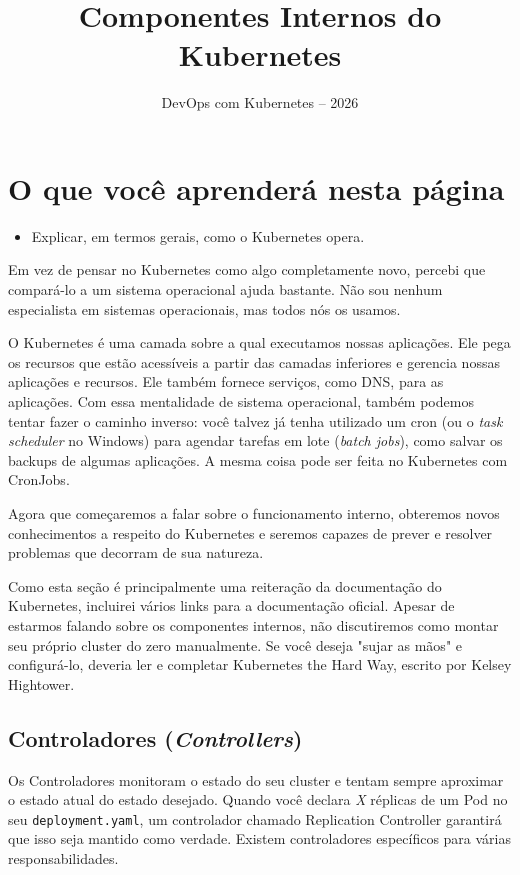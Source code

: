 \documentclass[11pt,a4paper]{article}
\title{\color{secondary}\Huge\textbf{Componentes Internos do Kubernetes}}
\author{\color{primary}DevOps com Kubernetes -- 2026}
\date{}
\begin{document}
\maketitle

\section*{\color{primary}O que você aprenderá nesta página}
\begin{itemize}
    \item Explicar, em termos gerais, como o Kubernetes opera.
\end{itemize}

Em vez de pensar no Kubernetes como algo completamente novo, percebi que compará-lo a um sistema operacional ajuda bastante. Não sou nenhum especialista em sistemas operacionais, mas todos nós os usamos.

O Kubernetes é uma camada sobre a qual executamos nossas aplicações. Ele pega os recursos que estão acessíveis a partir das camadas inferiores e gerencia nossas aplicações e recursos. Ele também fornece serviços, como DNS, para as aplicações. Com essa mentalidade de sistema operacional, também podemos tentar fazer o caminho inverso: você talvez já tenha utilizado um cron (ou o \textit{task scheduler} no Windows) para agendar tarefas em lote (\textit{batch jobs}), como salvar os backups de algumas aplicações. A mesma coisa pode ser feita no Kubernetes com CronJobs.

Agora que começaremos a falar sobre o funcionamento interno, obteremos novos conhecimentos a respeito do Kubernetes e seremos capazes de prever e resolver problemas que decorram de sua natureza.

Como esta seção é principalmente uma reiteração da documentação do Kubernetes, incluirei vários links para a documentação oficial. Apesar de estarmos falando sobre os componentes internos, não discutiremos como montar seu próprio cluster do zero manualmente. Se você deseja "sujar as mãos" e configurá-lo, deveria ler e completar Kubernetes the Hard Way, escrito por Kelsey Hightower.

\subsection*{\color{secondary}Controladores (\textit{Controllers})}
Os Controladores monitoram o estado do seu cluster e tentam sempre aproximar o estado atual do estado desejado. Quando você declara \textit{X} réplicas de um Pod no seu \texttt{deployment.yaml}, um controlador chamado Replication Controller garantirá que isso seja mantido como verdade. Existem controladores específicos para várias responsabilidades.
\end{document}
